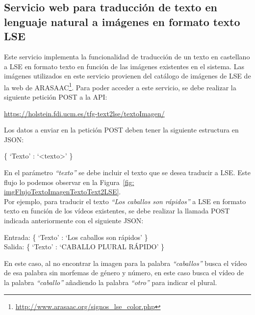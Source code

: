 \subsection{Servicio web para traducción de texto en lenguaje natural a imágenes en formato texto LSE}

Este servicio implementa la funcionalidad de traducción de un texto en castellano a LSE en formato texto en función de las imágenes existentes en el sistema. Las imágenes utilizados en este servicio provienen del catálogo de imágenes de LSE de la web de ARASAAC\footnote{\url{http://www.arasaac.org/signos_lse_color.php}}. Para poder acceder a este servicio, se debe realizar la siguiente petición POST a la API:\\

\begin{shaded}
	\url{https://holstein.fdi.ucm.es/tfg-text2lse/textoImagen/  }	
\end{shaded}


Los datos a enviar en la petición POST deben tener la siguiente estructura en JSON: 
\begin{center}
	
	\{ `Texto' : `<texto>' \}
	
\end{center}


En el parámetro \textit{``texto''} se debe incluir el texto que se desea traducir a LSE. Este flujo lo podemos observar en la Figura~\ref {fig: imgFlujoTextoImagenTextoText2LSE}.\\

Por ejemplo, para traducir el texto \textit{``Los caballos son rápidos''} a LSE en formato texto en función de los vídeos existentes, se debe realizar la llamada POST indicada anteriormente con el siguiente JSON:


\begin{center}
	Entrada: \{ `Texto' : `Los caballos son rápidos' \} \\
	Salida: \{ `Texto' : `CABALLO PLURAL RÁPIDO' \}
\end{center}

En este caso, al no encontrar la imagen para la palabra \textit{``caballos''} busca el vídeo de esa palabra sin morfemas de género y número, en este caso busca el vídeo de la palabra \textit{``caballo''} añadiendo la palabra  \textit{``otro''} para indicar el plural.


